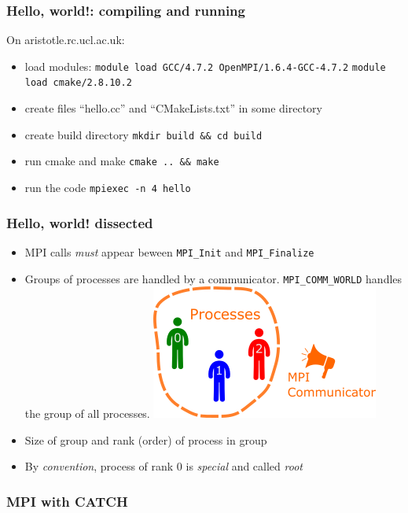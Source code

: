 \subsubsection{Hello, world!: compiling and
running}\label{hello-world-compiling-and-running}

On aristotle.rc.ucl.ac.uk:

\begin{itemize}
\itemsep1pt\parskip0pt
\item
  load modules: \texttt{module load GCC/4.7.2 OpenMPI/1.6.4-GCC-4.7.2}
  \texttt{module load cmake/2.8.10.2}
\item
  create files ``hello.cc'' and ``CMakeLists.txt'' in some directory
\item
  create build directory \texttt{mkdir build \&\& cd build}
\item
  run cmake and make \texttt{cmake .. \&\& make}
\item
  run the code \texttt{mpiexec -n 4 hello}
\end{itemize}

\subsubsection{Hello, world! dissected}\label{hello-world-dissected}

\begin{itemize}
\item
  MPI calls \emph{must} appear beween \texttt{MPI\_Init} and
  \texttt{MPI\_Finalize}
\item
  Groups of processes are handled by a communicator.
  \texttt{MPI\_COMM\_WORLD} handles the group of all processes.
  \includegraphics{06MPI/figures/world.png}
\item
  Size of group and rank (order) of process in group
\item
  By \emph{convention}, process of rank 0 is \emph{special} and called
  \emph{root}
\end{itemize}

\subsubsection{MPI with CATCH}\label{mpi-with-catch}

